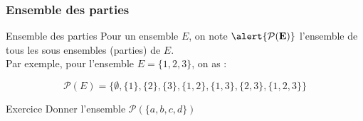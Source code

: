 \documentclass{beamer}
\begin{document}
\begin{frame}[<+->]
  \frametitle{Ensemble des parties}
 \small 
  \begin{block}{Ensemble des parties}
    Pour un ensemble $E$, on note $\mathbf{\alert{\mathcal{P}(E)}}$ l'ensemble
    de tous les sous ensembles (parties) de $E$.\\


    Par exemple, pour l'ensemble $E  = \{1,2,3\}$, on as :

    \begin{equation}
      \mathcal{P}(E)=\big\{\emptyset, \{1\}, \{2\}, \{3\},
      \{1,2\},\{1,3\},\{2,3\},\{1,2,3\}\big\}
    \end{equation}
  \end{block}
  \begin{block}{Exercice}
    Donner l'ensemble $\mathcal{P}(\{a,b,c,d\})$
  \end{block}
\end{frame}
\end{document}
